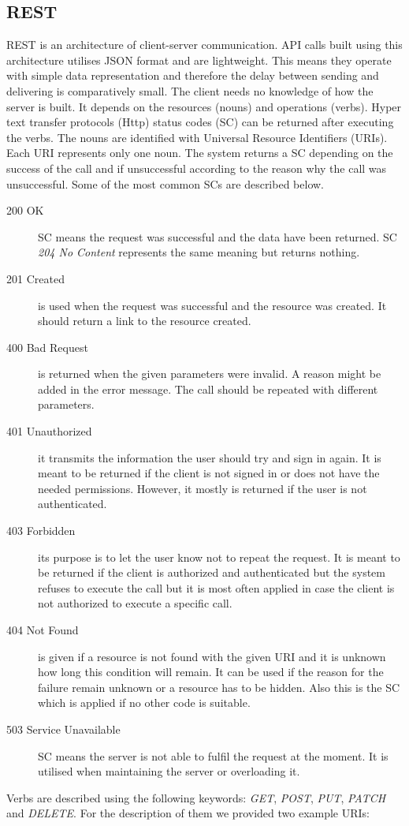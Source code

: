 	\subsection{REST} \label{analysisREST}
	REST is an architecture of client-server communication. API calls built using this architecture utilises JSON format and are lightweight. This means they operate with simple data representation and therefore the delay between sending and delivering is comparatively small. The client needs no knowledge of how the server is built. It depends on the resources (nouns) and operations (verbs). Hyper text transfer protocols (Http) status codes (SC) can be returned after executing the verbs. The nouns are identified with Universal Resource Identifiers (URIs). Each URI represents only one noun. The system returns a SC depending on the success of the call and if unsuccessful according to the reason why the call was unsuccessful. Some of the most common SCs are described below. \cite{rfc-2616}
	\begin {description}
	\item [200 OK] SC means the request was successful and the data have been returned. SC \textit{204 No Content} represents the same meaning but returns nothing.
	\item [201 Created] is used when the request was successful and the resource was created. It should return a link to the resource created.
	\item [400 Bad Request] is returned when the given parameters were invalid. A reason might be added in the error message. The call should be repeated with different parameters.
	\item [401 Unauthorized] it transmits the information the user should try and sign in again. It is meant to be returned if the client is not signed in or does not have the needed permissions. However, it mostly is returned if the user is not authenticated.
	\item [403 Forbidden] its purpose is to let the user know not to repeat the request. It is meant to be returned if the client is authorized and authenticated but the system refuses to execute the call but it is most often applied in case the client is not authorized to execute a specific call.
	\item [404 Not Found] is given if a resource is not found with the given URI and it is unknown how long this condition will remain. It can be used if the reason for the failure remain unknown or a resource has to be hidden. Also this is the SC which is applied if no other code is suitable.
	\item [503 Service Unavailable] SC means the server is not able to fulfil the request at the moment. It is utilised when maintaining the server or overloading it.
	\end{description}	
	Verbs are described using the following keywords: \textit{GET}, \textit{POST}, \textit{PUT}, \textit{PATCH} and \textit{DELETE}. For the description of them we provided two example URIs:
	
